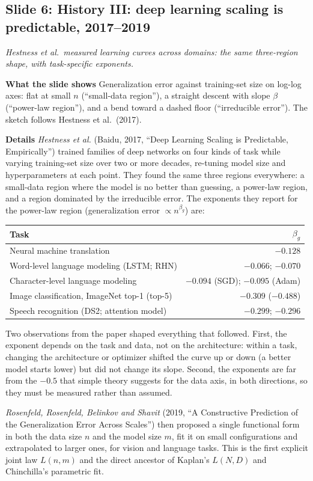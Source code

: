 \documentclass[11pt,letterpaper]{article}
\newcommand{\slide}[3]{%
  \subsection[Slide #1: #2]{Slide #1: #2}%
  {\color{muted}\itshape #3\par}\medskip}
\newcommand{\para}[1]{\medskip\noindent\textbf{#1}\quad}
\begin{document}
\slide{6}{History III: deep learning scaling is predictable, 2017--2019}{Hestness et al.\ measured learning curves across domains: the same three-region shape, with task-specific exponents.}

\para{What the slide shows} Generalization error against training-set size on log-log axes: flat at small $n$ (``small-data region''), a straight descent with slope $\beta$ (``power-law region''), and a bend toward a dashed floor (``irreducible error''). The sketch follows Hestness et al.\ (2017).

\para{Details} \emph{Hestness et al.} (Baidu, 2017, ``Deep Learning Scaling is Predictable, Empirically'') trained families of deep networks on four kinds of task while varying training-set size over two or more decades, re-tuning model size and hyperparameters at each point. They found the same three regions everywhere: a small-data region where the model is no better than guessing, a power-law region, and a region dominated by the irreducible error. The exponents they report for the power-law region (generalization error $\propto n^{\beta_g}$) are:
\begin{center}
\small
\begin{tabular}{@{}lr@{}}
\toprule
Task & $\beta_g$ \\
\midrule
Neural machine translation & $-0.128$ \\
Word-level language modeling (LSTM; RHN) & $-0.066$; $-0.070$ \\
Character-level language modeling & $-0.094$ (SGD); $-0.095$ (Adam) \\
Image classification, ImageNet top-1 (top-5) & $-0.309$ ($-0.488$) \\
Speech recognition (DS2; attention model) & $-0.299$; $-0.296$ \\
\bottomrule
\end{tabular}
\end{center}
Two observations from the paper shaped everything that followed. First, the exponent depends on the task and data, not on the architecture: within a task, changing the architecture or optimizer shifted the curve up or down (a better model starts lower) but did not change its slope. Second, the exponents are far from the $-0.5$ that simple theory suggests for the data axis, in both directions, so they must be measured rather than assumed.

\emph{Rosenfeld, Rosenfeld, Belinkov and Shavit} (2019, ``A Constructive Prediction of the Generalization Error Across Scales'') then proposed a single functional form in both the data size $n$ and the model size $m$, fit it on small configurations and extrapolated to larger ones, for vision and language tasks. This is the first explicit joint law $L(n,m)$ and the direct ancestor of Kaplan's $L(N,D)$ and Chinchilla's parametric fit.
\end{document}
